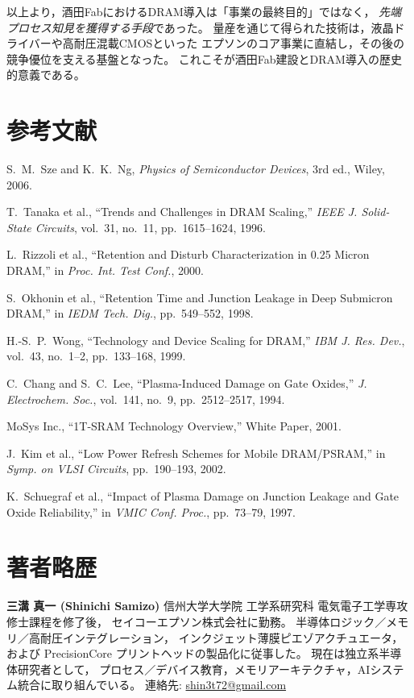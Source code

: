 \documentclass[conference]{IEEEtran}
\begin{document}
以上より，酒田FabにおけるDRAM導入は「事業の最終目的」ではなく，
\emph{先端プロセス知見を獲得する手段}であった。
量産を通じて得られた技術は，液晶ドライバーや高耐圧混載CMOSといった
エプソンのコア事業に直結し，その後の競争優位を支える基盤となった。
これこそが酒田Fab建設とDRAM導入の歴史的意義である。

\section*{参考文献}
\begin{thebibliography}{00}
S.~M.~Sze and K.~K.~Ng, \emph{Physics of Semiconductor Devices}, 3rd ed., Wiley, 2006.

T.~Tanaka et al., ``Trends and Challenges in DRAM Scaling,'' \emph{IEEE J. Solid-State Circuits}, vol.~31, no.~11, pp.~1615--1624, 1996.

L.~Rizzoli et al., ``Retention and Disturb Characterization in 0.25 Micron DRAM,'' in \emph{Proc. Int. Test Conf.}, 2000.

S.~Okhonin et al., ``Retention Time and Junction Leakage in Deep Submicron DRAM,'' in \emph{IEDM Tech. Dig.}, pp.~549--552, 1998.

H.-S.~P.~Wong, ``Technology and Device Scaling for DRAM,'' \emph{IBM J. Res. Dev.}, vol.~43, no.~1–2, pp.~133--168, 1999.

C.~Chang and S.~C.~Lee, ``Plasma-Induced Damage on Gate Oxides,'' \emph{J. Electrochem. Soc.}, vol.~141, no.~9, pp.~2512--2517, 1994.

MoSys Inc., ``1T-SRAM Technology Overview,'' White Paper, 2001.

J.~Kim et al., ``Low Power Refresh Schemes for Mobile DRAM/PSRAM,'' in \emph{Symp. on VLSI Circuits}, pp.~190--193, 2002.

K.~Schuegraf et al., ``Impact of Plasma Damage on Junction Leakage and Gate Oxide Reliability,'' in \emph{VMIC Conf. Proc.}, pp.~73--79, 1997.
\end{thebibliography}

\section*{著者略歴}
\noindent\textbf{三溝 真一 (Shinichi Samizo)}  
信州大学大学院 工学系研究科 電気電子工学専攻修士課程を修了後，
セイコーエプソン株式会社に勤務。  
半導体ロジック／メモリ／高耐圧インテグレーション，
インクジェット薄膜ピエゾアクチュエータ，
および PrecisionCore プリントヘッドの製品化に従事した。  
現在は独立系半導体研究者として，
プロセス／デバイス教育，メモリアーキテクチャ，AIシステム統合に取り組んでいる。  
連絡先: \href{mailto:shin3t72@gmail.com}{shin3t72@gmail.com}
\end{document}
